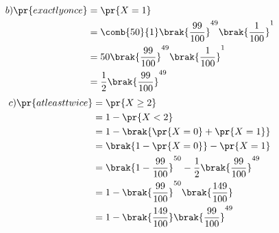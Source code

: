 \documentclass[journal,12pt,twocolumn]{IEEEtran}
\theoremstyle{remark}
\begin{document}
 \begin{align}
b) \pr{exactly once} &= \pr{X=1} \\
  &= \comb{50}{1}\brak{\frac{99}{100}}^{49}\brak{\frac{1}{100}}^{1} \\
  &= 50\brak{\frac{99}{100}}^{49}\brak{\frac{1}{100}}^{1} \\
  &= \frac{1}{2}\brak{\frac{99}{100}}^{49}
\end{align} 
\begin{align}
c) \pr{atleast twice} &= \pr{X \geq 2} \\
   &= 1 - \pr{X<2} \\
   &= 1 - \brak{\pr{X=0}+\pr{X=1}} \\
 &= \brak{1 - \pr{X=0}} - \pr{X=1} \\
   &= \brak{1 - \frac{99}{100}}^{50} - \frac{1}{2}\brak{\frac{99}{100}}^{49} \\
   &= 1 - \brak{\frac{99}{100}}^{50}\brak{\frac{149}{100}} \\
   &= 1 - \brak{\frac{149}{100}}\brak{\frac{99}{100}}^{49}
\end{align}
\end{document}
